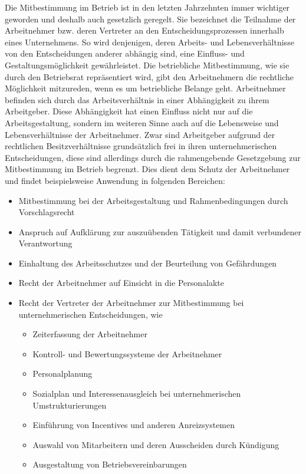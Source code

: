 Die Mitbestimmung im Betrieb ist in den letzten Jahrzehnten immer wichtiger geworden und deshalb auch gesetzlich geregelt. Sie bezeichnet die Teilnahme der Arbeitnehmer bzw. deren Vertreter an den Entscheidungsprozessen innerhalb eines Unternehmens. So wird denjenigen, deren Arbeits- und Lebensverhältnisse von den Entscheidungen anderer abhängig sind, eine Einfluss- und Gestaltungsmöglichkeit gewährleistet. 
\newline
Die betriebliche Mitbestimmung, wie sie durch den Betriebsrat repräsentiert wird, gibt den Arbeitnehmern die rechtliche Möglichkeit mitzureden, wenn es um betriebliche Belange geht.
\newline
Arbeitnehmer befinden sich durch das Arbeitsverhältnis in einer Abhängigkeit zu ihrem Arbeitgeber. Diese Abhängigkeit hat einen Einfluss nicht nur auf die Arbeitsgestaltung, sondern im weiteren Sinne auch auf die Lebensweise und Lebensverhältnisse der Arbeitnehmer. 
\newline
Zwar sind Arbeitgeber aufgrund der rechtlichen Besitzverhältnisse grundsätzlich frei in ihren unternehmerischen Entscheidungen, diese sind allerdings durch die rahmengebende Gesetzgebung zur Mitbestimmung im Betrieb begrenzt. Dies dient dem Schutz der Arbeitnehmer und findet beispielsweise Anwendung in folgenden Bereichen:
\begin{itemize}
	\item Mitbestimmung bei der Arbeitsgestaltung und Rahmenbedingungen durch Vorschlagsrecht
	\item Anspruch auf Aufklärung zur auszuübenden Tätigkeit und damit verbundener Verantwortung
	\item Einhaltung des Arbeitsschutzes und der Beurteilung von Gefährdungen
	\item Recht der Arbeitnehmer auf Einsicht in die Personalakte
	\item Recht der Vertreter der Arbeitnehmer zur Mitbestimmung bei unternehmerischen Entscheidungen, wie
	\begin{itemize}
		\item Zeiterfassung der Arbeitnehmer
		\item Kontroll- und Bewertungssysteme der Arbeitnehmer
		\item Personalplanung
		\item Sozialplan und Interessenausgleich bei unternehmerischen Umstrukturierungen
		\item Einführung von Incentives und anderen Anreizsystemen
		\item Auswahl von Mitarbeitern und deren Ausscheiden durch Kündigung
		\item Ausgestaltung von Betriebsvereinbarungen
	\end{itemize}
\end{itemize}